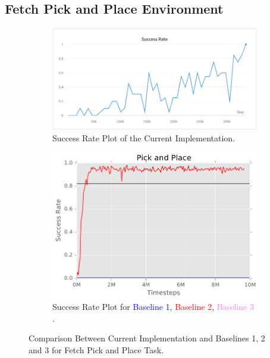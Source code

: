 \subsection{Fetch Pick and Place Environment}

\begin{figure}[h!]
     \centering
     \begin{subfigure}[b]{0.4\textwidth}
         \centering
         \includegraphics[width=\textwidth]{images/FPAPASR.png}
         \caption{Success Rate Plot of the Current Implementation.}
     \end{subfigure}
     \begin{subfigure}[b]{0.4\textwidth}
         \centering
         \includegraphics[width=\textwidth]{images/FPAPB.png}
         \caption{Success Rate Plot for \textcolor{blue}{Baseline 1}, \textcolor{red}{Baseline 2}, \textcolor{violet}{Baseline 3} \cite{nair2018overcoming}.}
     \end{subfigure}
        \caption{Comparison Between Current Implementation and Baselines 1, 2 and 3 for Fetch Pick and Place Task.}
        \label{fig:FPAPR1}
\end{figure}

